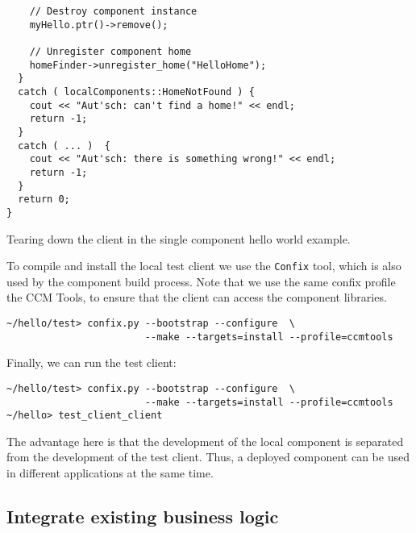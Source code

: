 \begin{Example}
\begin{minifbox}
\begin{small}
\begin{verbatim}
    // Destroy component instance
    myHello.ptr()->remove();

    // Unregister component home
    homeFinder->unregister_home("HelloHome");
  }
  catch ( localComponents::HomeNotFound ) {
    cout << "Aut'sch: can't find a home!" << endl;
    return -1;
  }
  catch ( ... )  {
    cout << "Aut'sch: there is something wrong!" << endl;
    return -1;
  }
  return 0;
}
\end{verbatim}
\end{small}
\end{minifbox}
\caption{Tearing down the client in the single component hello world example.}
\label{example:one-component-test-teardown}
\end{Example}

To compile and install the local test client we use the {\tt Confix} tool, which
is also used by the component build process. Note that we use the same confix
profile the CCM Tools, to ensure that the client can access the component
libraries.

\begin{small}
\begin{verbatim}
~/hello/test> confix.py --bootstrap --configure  \
                        --make --targets=install --profile=ccmtools
\end{verbatim}
\end{small}

Finally, we can run the test client:

\begin{small}
\begin{verbatim}
~/hello/test> confix.py --bootstrap --configure  \
                        --make --targets=install --profile=ccmtools
~/hello> test_client_client
\end{verbatim}
\end{small}

The advantage here is that the development of the local component is separated
from the development of the test client. Thus, a deployed component can be used
in different applications at the same time.

\subsection{Integrate existing business logic}

